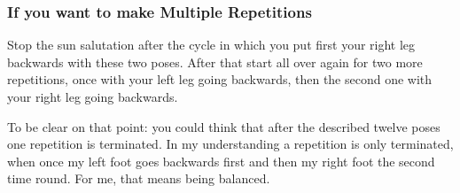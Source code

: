 \documentclass[../Book.Stress_regulation.tex]{subfiles}
\begin{document}
\subsubsection{If you want to make Multiple Repetitions}

Stop the sun salutation after the cycle in which you put first your right leg backwards with these two poses.
After that start all over again for two more repetitions, once with your left leg going backwards, then the second one with your right leg going backwards.

To be clear on that point: you could think that after the described twelve poses one repetition is terminated.
In my understanding a repetition is only terminated, when once my left foot goes backwards first and then my right foot the second time round.
For me, that means being balanced.
\end{document}
